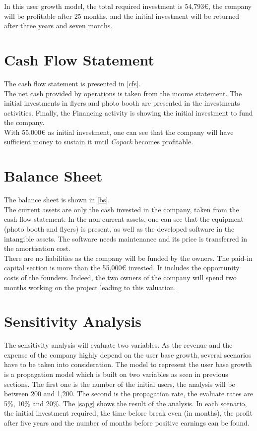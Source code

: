 \documentclass[12pt,a4paper,oneside]{book}
\newcommand{\bp}{\textit{Copark}}
\begin{document}
In this user growth model, the total required investment is 54,793\euro{}, the company will be profitable after 25 months, and the initial investment will be returned after three years and seven months.

\section{Cash Flow Statement}
The cash flow statement is presented in \autoref{cfs}.\\

The net cash provided by operations is taken from the income statement. The initial investments in flyers and photo booth are presented in the investments activities. Finally, the Financing activity is showing the initial investment to fund the company.\\

With 55,000\euro{} as initial investment, one can see that the company will have sufficient money to sustain it until \bp{} becomes profitable.

\section{Balance Sheet}
The balance sheet is shown in \autoref{bs}.\\

The current assets are only the cash invested in the company, taken from the cash flow statement. In the non-current assets, one can see that the equipment (photo booth and flyers) is present, as well as the developed software in the intangible assets. The software needs maintenance and its price is transferred in the amortisation cost.\\

There are no liabilities as the company will be funded by the owners. The paid-in capital section is more than the 55,000\euro{} invested. It includes the opportunity costs of the founders. Indeed, the two owners of the company will spend two months working on the project leading to this valuation.

\section{Sensitivity Analysis}

The sensitivity analysis will evaluate two variables. As the revenue and the expense of the company highly depend on the user base growth, several scenarios have to be taken into consideration. The model to represent the user base growth is a propagation model which is built on two variables as seen in previous sections. The first one is the number of the initial users, the analysis will be between 200 and 1,200. The second is the propagation rate, the evaluate rates are 5\%, 10\% and 20\%. The \autoref{sapg} shows the result of the analysis. In each scenario, the initial investment required, the time before break even (in months), the profit after five years and the number of months before positive earnings can be found.\\
\end{document}
